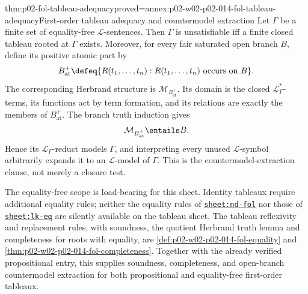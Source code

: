 \begin{hbtheorem}{thm:p02-fol-tableau-adequacy}{proved=annex:p02-w02-p02-014-fol-tableau-adequacy}{First-order tableau adequacy and countermodel extraction}
Let \(\Gamma\) be a finite set of equality-free \(\mathcal L\)-sentences.
Then \(\Gamma\) is unsatisfiable iff a finite closed tableau rooted at
\(\Gamma\) exists.  Moreover, for every fair saturated open branch \(B\),
define its positive atomic part by
\[
 B^{+}_{\mathrm{at}}
 \defeq
 \{R(t_1,\ldots,t_n):R(t_1,\ldots,t_n)\text{ occurs on }B\}.
\]
The corresponding Herbrand structure is
\(\mathcal M_{B^{+}_{\mathrm{at}}}\).  Its domain is the closed
\(\mathcal L_{\Gamma}^*\)-terms, its functions act by term formation, and
its relations are exactly the members of \(B^{+}_{\mathrm{at}}\).
The branch truth induction gives
\[
 \mathcal M_{B^{+}_{\mathrm{at}}}\entails B.
\]
Hence its
\(\mathcal L_{\Gamma}\)-reduct models \(\Gamma\), and interpreting every
unused \(\mathcal L\)-symbol arbitrarily expands it to an
\(\mathcal L\)-model of \(\Gamma\).
This is the countermodel-extraction clause, not merely a closure test.
\end{hbtheorem}

The equality-free scope is load-bearing for this sheet.  Identity tableaux
require additional equality rules; neither the equality rules of
\hyperref[sheet:nd-fol]{\texttt{sheet:nd-fol}} nor those of
\hyperref[sheet:lk-eq]{\texttt{sheet:lk-eq}} are silently available
on the tableau sheet.  The tableau reflexivity and replacement rules,
with soundness, the quotient Herbrand truth lemma and completeness for
roots with equality, are \cref{def:p02-w02-p02-014-fol-equality} and
\cref{thm:p02-w02-p02-014-fol-completeness}.  Together with the already verified propositional entry,
this supplies soundness, completeness, and open-branch countermodel extraction
for both propositional and equality-free first-order tableaux.

